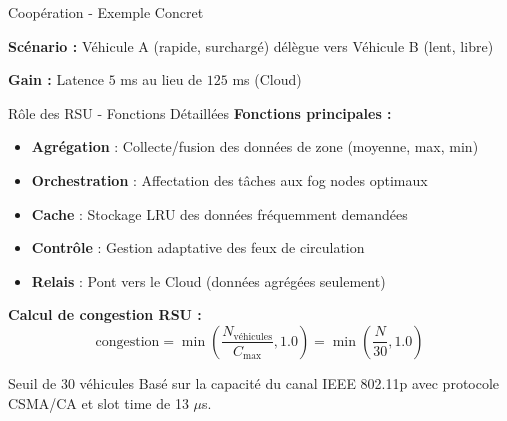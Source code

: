 ﻿\documentclass[aspectratio=169,11pt]{beamer}
\begin{document}
\begin{frame}{Coop\'eration - Exemple Concret}
\begin{center}
\end{center}

\textbf{Sc\'enario :} V\'ehicule A (rapide, surcharg\'e) d\'el\`egue vers V\'ehicule B (lent, libre)

\textbf{Gain :} Latence $5$ ms au lieu de $125$ ms (Cloud)
\end{frame}

\begin{frame}{R\^ole des RSU - Fonctions D\'etaill\'ees}
\textbf{Fonctions principales :}

\begin{itemize}
    \item \textbf{Agr\'egation} : Collecte/fusion des donn\'ees de zone (moyenne, max, min)
    \item \textbf{Orchestration} : Affectation des t\^aches aux fog nodes optimaux
    \item \textbf{Cache} : Stockage LRU des donn\'ees fr\'equemment demand\'ees
    \item \textbf{Contr\^ole} : Gestion adaptative des feux de circulation
    \item \textbf{Relais} : Pont vers le Cloud (donn\'ees agr\'eg\'ees seulement)
\end{itemize}

\vspace{0.3cm}
\textbf{Calcul de congestion RSU :}
\begin{equation}
\text{congestion} = \min\left(\frac{N_{\text{v\'ehicules}}}{C_{\text{max}}}, 1.0\right) = \min\left(\frac{N}{30}, 1.0\right)
\end{equation}

\begin{exampleblock}{Seuil de 30 v\'ehicules}
Bas\'e sur la capacit\'e du canal IEEE 802.11p avec protocole CSMA/CA et slot time de 13 $\mu$s.
\end{exampleblock}
\end{frame}
\end{document}
